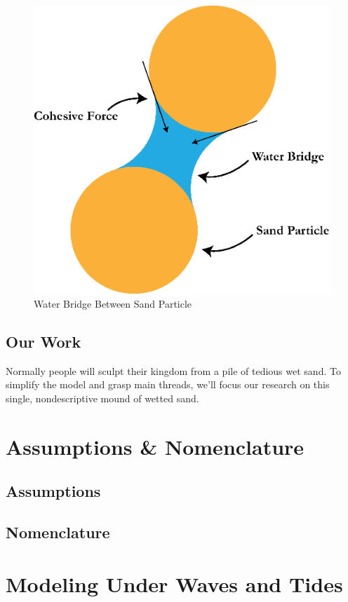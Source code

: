 \documentclass[12pt]{article}
\begin{document}
\begin{figure}
    \centering
    \includegraphics[width=0.5\linewidth]{water_bridge.eps}
    \caption{Water Bridge Between Sand Particle}
    \label{fig:water_bridge}
\end{figure}

\subsection{Our Work}
Normally people will sculpt their kingdom from a pile of tedious wet sand. To simplify the model and grasp main threads, we'll focus our research on this single, nondescriptive mound of wetted sand.

\section{Assumptions \& Nomenclature}
\subsection{Assumptions}
\subsection{Nomenclature}


\section{Modeling Under Waves and Tides}
\end{document}
